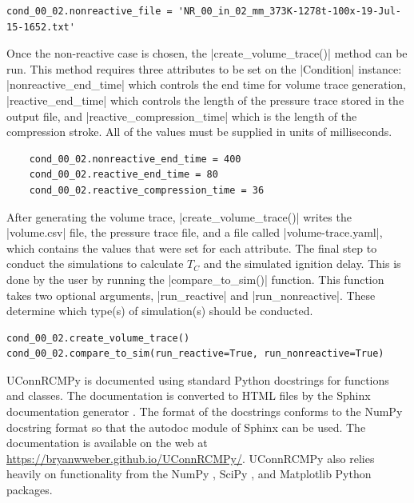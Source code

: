 \documentclass[12pt]{../ussci}
\begin{document}
\begin{verbatim}
cond_00_02.nonreactive_file = 'NR_00_in_02_mm_373K-1278t-100x-19-Jul-15-1652.txt'
\end{verbatim}

Once the non-reactive case is chosen, the \python|create_volume_trace()| method
can be run. This method requires three attributes to be set on the
\python|Condition| instance: \python|nonreactive_end_time| which controls the
end time for volume trace generation, \python|reactive_end_time| which controls
the length of the pressure trace stored in the output file, and
\python|reactive_compression_time| which is the length of the compression
stroke. All of the values must be supplied in units of milliseconds.

\begin{verbatim}
    cond_00_02.nonreactive_end_time = 400
    cond_00_02.reactive_end_time = 80
    cond_00_02.reactive_compression_time = 36
\end{verbatim}

After generating the volume trace, \python|create_volume_trace()| writes the
\python|volume.csv| file, the pressure trace file, and a file called
\python|volume-trace.yaml|, which contains the values that were set for each
attribute. The final step to conduct the simulations to calculate \(T_C\) and
the simulated ignition delay. This is done by the user by running the
\python|compare_to_sim()| function. This function takes two optional arguments,
\python|run_reactive| and \python|run_nonreactive|. These determine which
type(s) of simulation(s) should be conducted.

\begin{verbatim}
cond_00_02.create_volume_trace()
cond_00_02.compare_to_sim(run_reactive=True, run_nonreactive=True)
\end{verbatim}


UConnRCMPy is documented using standard Python docstrings for functions and
classes. The documentation is converted to HTML files by the Sphinx
documentation generator \autocite{Brandl2016}. The format of the docstrings
conforms to the NumPy docstring format so that the autodoc module of Sphinx can
be used. The documentation is available on the web at
\url{https://bryanwweber.github.io/UConnRCMPy/}. UConnRCMPy also relies heavily
on functionality from the NumPy \autocite{vanderWalt2011}, SciPy
\autocite{Jones2001}, and Matplotlib \autocite{Hunter2007} Python packages.
\end{document}
